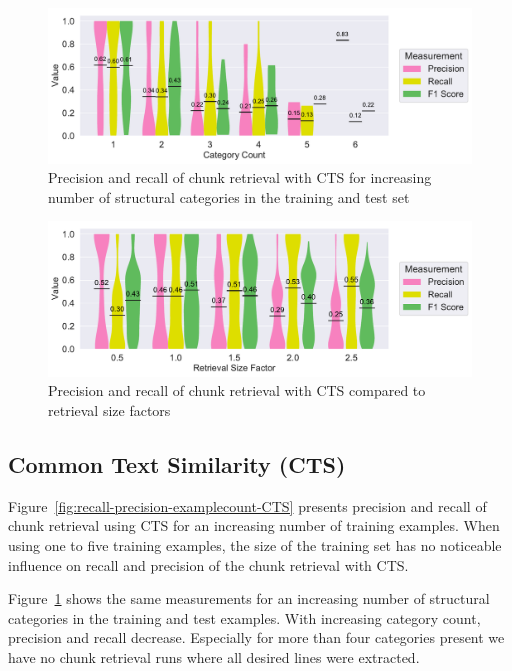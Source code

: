 \documentclass[\myrootdir/main.tex]{subfiles}
\begin{document}
\begin{figure}[htbp]
		\centering
		\includegraphics[width=\textwidth, clip]{img/big-study/recall-precision-categorycount-CTS.pdf}
		\caption{Precision and recall of chunk retrieval with CTS for increasing number of structural categories in the training and test set}
		\label{fig:recall-precision-categorycount-CTS}
\end{figure}

\begin{figure}[htbp]
		\centering
		\includegraphics[width=\textwidth, clip]{img/big-study/contextsizefactor-precision-recall-CTS.pdf}
		\caption{Precision and recall of chunk retrieval with CTS compared to retrieval size factors}
		\label{fig:contextsizefactor-precision-recall-CTS}
\end{figure}

\subsection{Common Text Similarity (CTS)}
Figure~\ref{fig:recall-precision-examplecount-CTS} presents precision and recall of chunk retrieval using CTS for an increasing number of training examples.
When using one to five training examples, the size of the training set has no noticeable influence on recall and precision of the chunk retrieval with CTS.

Figure~\ref{fig:recall-precision-categorycount-CTS} shows the same measurements for an increasing number of structural categories in the training and test examples.
With increasing category count, precision and recall decrease.
Especially for more than four categories present we have no chunk retrieval runs where all desired lines were extracted.
\end{document}
